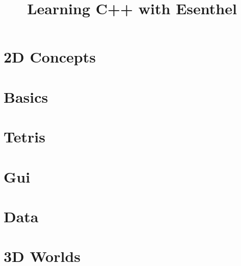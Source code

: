 \documentclass[11pt, oldfontcommands, oneside, a4paper]{memoir}
\title{Learning C++ with Esenthel}
\def \langPath {nl/}
\def \langPath {en/}
\begin{document}
\titleGM
\tableofcontents


\part{2D Concepts}






\part{Basics}











\part{Tetris}






\part{Gui}







\part{Data}







\part{3D Worlds}


\printindex
\end{document}
